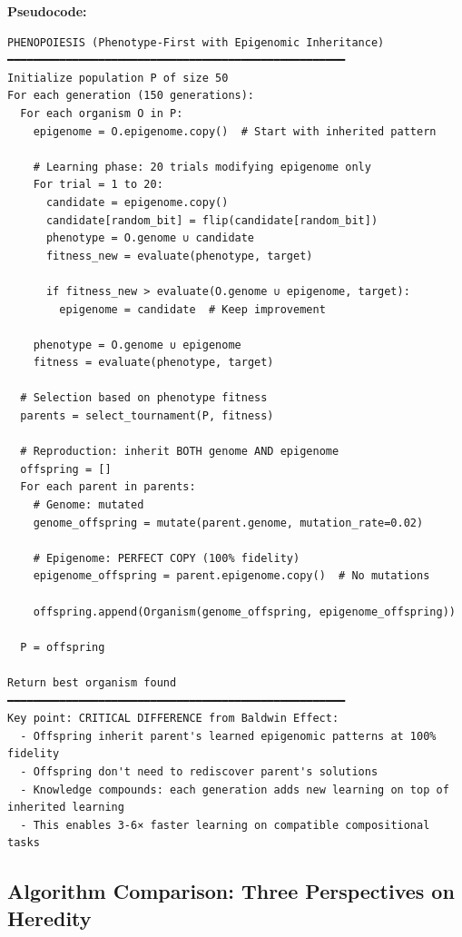 \documentclass[12pt]{article}
\begin{document}
\textbf{Pseudocode:}
\begin{verbatim}
PHENOPOIESIS (Phenotype-First with Epigenomic Inheritance)
━━━━━━━━━━━━━━━━━━━━━━━━━━━━━━━━━━━━━━━━━━━━━━━━━━━━
Initialize population P of size 50
For each generation (150 generations):
  For each organism O in P:
    epigenome = O.epigenome.copy()  # Start with inherited pattern

    # Learning phase: 20 trials modifying epigenome only
    For trial = 1 to 20:
      candidate = epigenome.copy()
      candidate[random_bit] = flip(candidate[random_bit])
      phenotype = O.genome ∪ candidate
      fitness_new = evaluate(phenotype, target)

      if fitness_new > evaluate(O.genome ∪ epigenome, target):
        epigenome = candidate  # Keep improvement

    phenotype = O.genome ∪ epigenome
    fitness = evaluate(phenotype, target)

  # Selection based on phenotype fitness
  parents = select_tournament(P, fitness)

  # Reproduction: inherit BOTH genome AND epigenome
  offspring = []
  For each parent in parents:
    # Genome: mutated
    genome_offspring = mutate(parent.genome, mutation_rate=0.02)

    # Epigenome: PERFECT COPY (100% fidelity)
    epigenome_offspring = parent.epigenome.copy()  # No mutations

    offspring.append(Organism(genome_offspring, epigenome_offspring))

  P = offspring

Return best organism found
━━━━━━━━━━━━━━━━━━━━━━━━━━━━━━━━━━━━━━━━━━━━━━━━━━━━
Key point: CRITICAL DIFFERENCE from Baldwin Effect:
  - Offspring inherit parent's learned epigenomic patterns at 100% fidelity
  - Offspring don't need to rediscover parent's solutions
  - Knowledge compounds: each generation adds new learning on top of inherited learning
  - This enables 3-6× faster learning on compatible compositional tasks
\end{verbatim}

\subsection*{Algorithm Comparison: Three Perspectives on Heredity}
\end{document}
